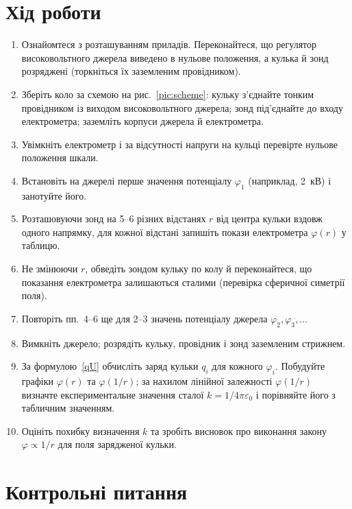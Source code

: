 \section{Хід роботи}

\begin{enumerate}
\item Ознайомтеся з розташуванням приладів. Переконайтеся, що регулятор високовольтного джерела виведено в нульове положення, а кулька й зонд розряджені (торкніться їх заземленим провідником).
\item Зберіть коло за схемою на рис.~\ref{pic:scheme}: кульку з'єднайте тонким провідником із виходом високовольтного джерела; зонд під'єднайте до входу електрометра; заземліть корпуси джерела й електрометра.
\item Увімкніть електрометр і за відсутності напруги на кульці перевірте нульове положення шкали.
\item Встановіть на джерелі перше значення потенціалу $\varphi_1$ (наприклад, 2~кВ) і занотуйте його.
\item Розташовуючи зонд на 5–6 різних відстанях $r$ від центра кульки вздовж одного напрямку, для кожної відстані запишіть покази електрометра $\varphi(r)$ у таблицю.
\item Не змінюючи $r$, обведіть зондом кульку по колу й переконайтеся, що показання електрометра залишаються сталими (перевірка сферичної симетрії поля).
\item Повторіть пп.~4–6 ще для 2–3 значень потенціалу джерела $\varphi_2,\varphi_3,\dots$
\item Вимкніть джерело; розрядіть кульку, провідник і зонд заземленим стрижнем.
\item За формулою~\eqref{qU} обчисліть заряд кульки $q_i$ для кожного $\varphi_i$. Побудуйте графіки $\varphi(r)$ та $\varphi(1/r)$; за нахилом лінійної залежності $\varphi(1/r)$ визначте експериментальне значення сталої $k=1/4\pi\varepsilon_0$ і порівняйте його з табличним значенням.
\item Оцініть похибку визначення $k$ та зробіть висновок про виконання закону $\varphi \propto 1/r$ для поля зарядженої кульки.
\end{enumerate}

\section*{Контрольні питання}

